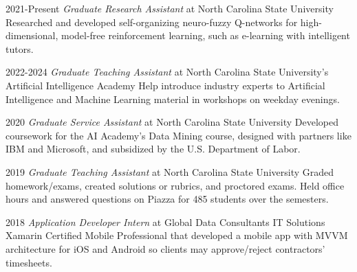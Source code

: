 

\begin{cvskills}
  \cvskill
    {2021-Present} %
    {\textit{Graduate Research Assistant} at North Carolina State University} %
    {\footnotesize Researched and developed self-organizing neuro-fuzzy Q-networks for high-dimensional, model-free reinforcement learning, such as e-learning with intelligent tutors.}

  \cvskill
    {2022-2024} %
    {\textit{Graduate Teaching Assistant} at North Carolina State University's Artificial Intelligence Academy} %
    {\footnotesize Help introduce industry experts to Artificial Intelligence and Machine Learning material in workshops on weekday evenings.}

  \cvskill
    {2020} %
    {\textit{Graduate Service Assistant} at North Carolina State University} %
    {\footnotesize Developed coursework for the AI Academy's Data Mining course, designed with partners like IBM and Microsoft, and subsidized by the U.S. Department of Labor.}

  \cvskill
    {2019} %
    {\textit{Graduate Teaching Assistant} at North Carolina State University} %
    {\footnotesize Graded homework/exams, created solutions or rubrics, and proctored exams. Held office hours and answered questions on Piazza for 485 students over the semesters.}

  \cvskill
    {2018} %
    {\textit{Application Developer Intern} at Global Data Consultants IT Solutions} %
    {\footnotesize Xamarin Certified Mobile Professional that developed a mobile app with MVVM architecture for iOS and Android so clients may approve/reject contractors' timesheets.}

\end{cvskills}
